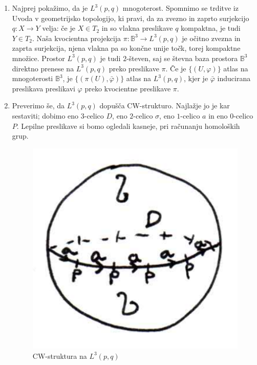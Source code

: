 \documentclass[a4paper, 12pt]{article}
\newcommand{\B}{\mathbb{B}}
\begin{document}
\begin{enumerate}[label=(\alph*)]
	\item Najprej pokažimo, da je $L^3(p, q)$ mnogoterost. Spomnimo se trditve iz Uvoda v geometrijsko topologijo, ki pravi, da za zvezno in zaprto surjekcijo $q \colon X \to Y$ velja: če je $X \in T_2$ in so vlakna preslikave $q$ kompaktna, je tudi $Y \in T_2$. Naša kvocientna projekcija $\pi \colon \B^3 \to L^3(p, q)$ je očitno zvezna in zaprta surjekcija, njena vlakna pa so končne unije točk, torej kompaktne množice. Prostor $L^3(p, q)$ je tudi $2$-števen, saj se števna baza prostora $\B^3$ direktno prenese na $L^3(p, q)$ preko preslikave $\pi$. Če je $\lbrace (U, \varphi) \rbrace$ atlas na mnogoterosti $\B^3$, je $\lbrace (\pi(U), \bar{\varphi}) \rbrace$ atlas na $L^3(p, q)$, kjer je $\bar{\varphi}$ inducirana preslikava preslikavi $\varphi$ preko kvocientne preslikave $\pi$.
	\item Preverimo še, da $L^3(p, q)$ dopušča CW-strukturo. Najlažje jo je kar sestaviti; dobimo eno $3$-celico $D$, eno $2$-celico $\sigma$, eno $1$-celico $a$ in eno $0$-celico $P$. Lepilne preslikave si bomo ogledali kasneje, pri računanju homoloških grup.
	
	\begin{figure}[h]
		\centering
		\includegraphics[scale=0.4]{cw4b.png}
		\caption{CW-struktura na $L^3(p, q)$}
		\label{fig:cw4b}
	\end{figure}
	

\end{enumerate}
\end{document}
